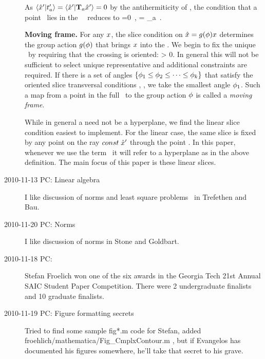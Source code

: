 \begin{description}
\begin{definition}
As $ \braket{\slicep}{\sliceTan{a}}=\braket{\slicep}{\Lg_a \slicep} =0 $
by the antihermiticity of \Lg, the condition that a point \sspRed\ lies
in the \slice\ \pSRed\ reduces to
\beq
{}=0
    \,,\qquad
{} = \Lg_a \slicep
\,.
\end{definition}


\begin{definition}
\label{def:movingFrame}
\textbf{Moving frame.}
For any $x$, the slice condition  on $\hat{x} =
g({\bf \phi})x$ determines the group
action $g({\bf \phi})$ that brings $ x$ into the \slice.
We begin to fix the unique \reducedsp\ by requiring that the crossing is
oriented:
\beq
\braket{\groupTan_{}(\ssp)}{\sliceTan{}} > 0.
In general this will not be sufficient to select unique representative and additional constraints are required.
If there is a set of angles
$\{{\bf \phi}_1\leq{\bf \phi}_2\leq\cdots\leq{\bf \phi}_k \}$ that
satisfy the oriented slice transversal conditions
, , we take the
smallest angle ${\bf \phi}_1$.
Such a map from a point in the full \statesp\ to the group action
${\bf \phi}$ is called a
\emph{moving frame}.
\end{definition}

While in general a {\slice} need not be a hyperplane,
we find the linear slice condition  easiest to implement.
For the linear case, the same slice is fixed by any
point on the ray $const\; {\hat{x}'}$ through the point \slicep.
In this paper, whenever we use the term \slice\ it will refer to a
hyperplane as in the above definition. The main focus of this paper is
these linear slices.

\item[2010-11-13 PC: Linear algebra]
I like discussion of norms and least square problems \etc\
in Trefethen and Bau.

\item[2010-11-20 PC: Norms]
I like discussion of norms in Stone and Goldbart.

\item[2010-11-18 PC:]
Stefan Froelich won one of the six awards in the Georgia Tech 21st Annual
SAIC Student Paper Competition. There were 2 undergraduate finalists and
10 graduate finalists.

\item[2010-11-19 PC: Figure formatting secrets]
Tried to find some sample fig*.m code for Stefan, added
froehlich/mathematica/Fig\_CmplxContour.m , but if Evangelos has
documented his figures somewhere, he'll take that secret to his grave.


\end{description}
